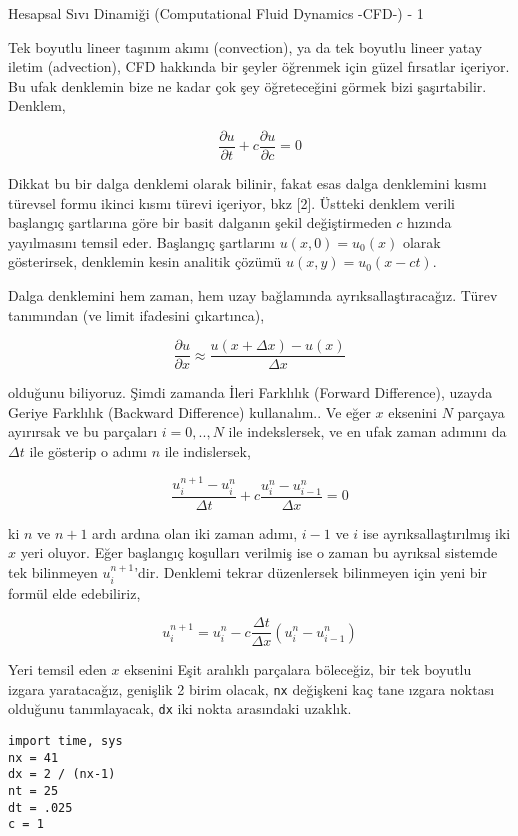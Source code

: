 \documentclass[12pt,fleqn]{article}\usepackage{../../common}
\begin{document}
Hesapsal Sıvı Dinamiği (Computational Fluid Dynamics -CFD-) - 1

Tek boyutlu lineer taşınım akımı (convection), ya da tek boyutlu lineer yatay
iletim (advection), CFD hakkında bir şeyler öğrenmek için güzel fırsatlar
içeriyor. Bu ufak denklemin bize ne kadar çok şey öğreteceğini görmek bizi
şaşırtabilir. Denklem,

$$
\frac{\partial u}{\partial t} +
c \frac{\partial u}{\partial c}  = 0
$$

Dikkat bu bir dalga denklemi olarak bilinir, fakat esas dalga denklemini kısmı
türevsel formu ikinci kısmı türevi içeriyor, bkz [2]. Üstteki denklem verili
başlangıç şartlarına göre bir basit dalganın şekil değiştirmeden $c$ hızında
yayılmasını temsil eder. Başlangıç şartlarını $u(x,0) = u_0(x)$ olarak
gösterirsek, denklemin kesin analitik çözümü $u(x,y) = u_0(x-ct)$. 

Dalga denklemini hem zaman, hem uzay bağlamında ayrıksallaştıracağız. Türev
tanımından (ve limit ifadesini çıkartınca),

$$
\frac{\partial u}{\partial x} \approx
\frac{u(x+\Delta x) - u(x)}{\Delta x}
$$

olduğunu biliyoruz. Şimdi zamanda İleri Farklılık (Forward Difference), uzayda
Geriye Farklılık (Backward Difference) kullanalım.. Ve eğer $x$ eksenini $N$
parçaya ayırırsak ve bu parçaları $i=0,..,N$ ile indekslersek, ve en ufak zaman
adımını da $\Delta t$ ile gösterip o adımı $n$ ile indislersek,

$$
\frac{u_i^{n+1} - u_i^n}{\Delta t} + c \frac{u_i^{n} - u_{i-1}^n}{\Delta x} = 0
$$

ki $n$ ve $n+1$ ardı ardına olan iki zaman adımı, $i-1$ ve $i$ ise
ayrıksallaştırılmış iki $x$ yeri oluyor. Eğer başlangıç koşulları verilmiş ise o
zaman bu ayrıksal sistemde tek bilinmeyen $u_i^{n+1}$'dir. Denklemi tekrar
düzenlersek bilinmeyen için yeni bir formül elde edebiliriz,

$$
u_i^{n+1} = u_i^n - c \frac{\Delta t}{\Delta x} ( u_i^n - u_{i-1}^n )
$$

Yeri temsil eden $x$ eksenini Eşit aralıklı parçalara böleceğiz, bir tek boyutlu
izgara yaratacağız, genişlik 2 birim olacak, \verb!nx! değişkeni kaç tane ızgara
noktası olduğunu tanımlayacak, \verb!dx! iki nokta arasındaki uzaklık.

\begin{verbatim}
import time, sys
nx = 41  
dx = 2 / (nx-1)
nt = 25  
dt = .025
c = 1    
\end{verbatim}
\end{document}
